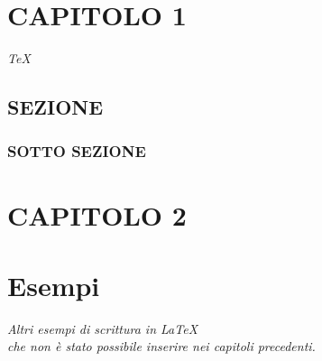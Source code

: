 \documentclass[envcountsame,envcountchap]{svmono}
\begin{document}

\chapter{CAPITOLO 1} \label{Cap.1}

\vspace{2cm}

\begin{flushright}
\textit{TeX}
\end{flushright}

\vspace{0.5cm}


\section{SEZIONE}\label{sottosezione}


\subsection{SOTTO SEZIONE}

\chapter{CAPITOLO 2} \label{Cap.2}

\vspace{2cm}

\begin{flushright}
\textit{}
\end{flushright}

\vspace{0.5cm}


\chapter{Esempi}  \label{Cap.3}

\vspace{2cm}

\begin{flushright}
 \textit{Altri esempi di scrittura in \LaTeX\\ che non è stato possibile inserire nei capitoli precedenti.}
\end{flushright}

\vspace{0.5cm}
\end{document}
